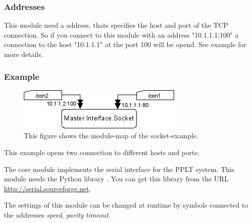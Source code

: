 \subsubsection{Addresses}
This module need a address, thats specifies the host and port of the TCP 
connection. So if you connect to this module with an address "10.1.1.1:100"
a connection to the host "10.1.1.1" at the port 100 will be opend. See 
example for more details.  

\subsubsection{Example}
\begin{figure}[ht]
    \label{fig:coremod02}
    \centering
    \includegraphics[scale=1]{coremod02.png}
    \caption{This figure shows the module-map of the socket-example.}
\end{figure}    
This example opens two connection to different hosts and ports:




%
%
The  core module implements the serial
interface for the PPLT system. This module needs the Python library 
. You can get this library from the URL 
\url{http://serial.sourceforge.net}. 

The settings of this module can be changed at runtime by symbols connected to
the addresses \emph{speed}, \emph{parity} \emph{timeout}.

